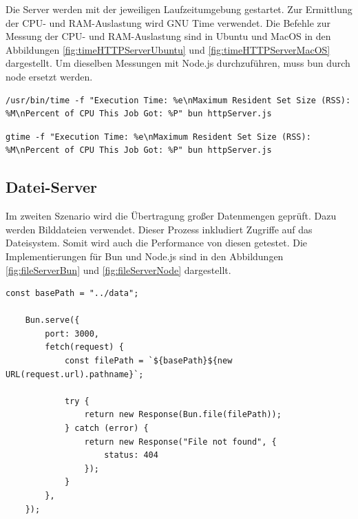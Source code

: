 \noindent
Die Server werden mit der jeweiligen Laufzeitumgebung gestartet. Zur Ermittlung der CPU- und RAM-Auslastung wird GNU Time verwendet. Die Befehle zur Messung der CPU- und RAM-Auslastung sind in Ubuntu und MacOS in den Abbildungen \ref{fig:timeHTTPServerUbuntu} und \ref{fig:timeHTTPServerMacOS} dargestellt. Um dieselben Messungen mit Node.js durchzuführen, muss \glq bun\grq{} durch \glq node\grq{} ersetzt werden.

\begin{lstlisting}[caption={[CPU- und RAM-Messung auf dem Desktop-PC]CPU- und RAM-Messung auf dem Desktop-PC\\\textit{Quelle: Eigene Darstellung}},label={fig:timeHTTPServerUbuntu}]
	/usr/bin/time -f "Execution Time: %e\nMaximum Resident Set Size (RSS): %M\nPercent of CPU This Job Got: %P" bun httpServer.js
\end{lstlisting}

\begin{lstlisting}[caption={[CPU- und RAM-Messung auf dem MacBook Pro]CPU- und RAM-Messung auf dem MacBook Pro\\\textit{Quelle: Eigene Darstellung}},label={fig:timeHTTPServerMacOS}]
	gtime -f "Execution Time: %e\nMaximum Resident Set Size (RSS): %M\nPercent of CPU This Job Got: %P" bun httpServer.js
\end{lstlisting}

\subsection{Datei-Server} \label{subsec:fileServer}
Im zweiten Szenario wird die Übertragung großer Datenmengen geprüft. Dazu werden Bilddateien verwendet. Dieser Prozess inkludiert Zugriffe auf das Dateisystem. Somit wird auch die Performance von diesen getestet. Die Implementierungen für Bun und Node.js sind in den Abbildungen \ref{fig:fileServerBun} und \ref{fig:fileServerNode} dargestellt.

\begin{lstlisting}[caption={[Datei-Server Bun]Datei-Server Bun\\\textit{Quelle: Eigene Darstellung}},label={fig:fileServerBun}]
	const basePath = "../data";
	
	Bun.serve({
		port: 3000,
		fetch(request) {
			const filePath = `${basePath}${new URL(request.url).pathname}`;
			
			try {
				return new Response(Bun.file(filePath));
			} catch (error) {
				return new Response("File not found", {
					status: 404
				});
			}
		},
	});
\end{lstlisting}

